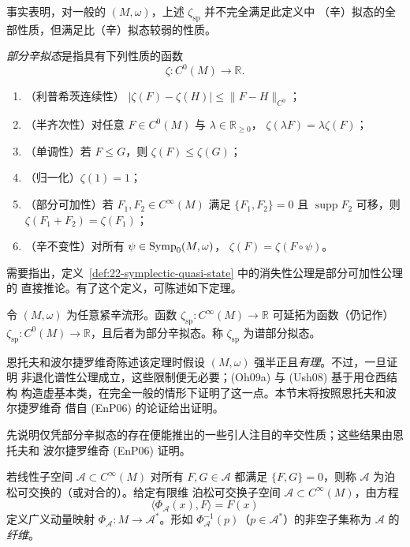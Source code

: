 事实表明，对一般的 $(M,\omega)$，上述 $\zeta_{\mathrm{sp}}$ 并不完全满足此定义中
（辛）拟态的全部性质，但满足比（辛）拟态较弱的性质。

\begin{definition}
\label{def:22-partial-symplectic-quasi-state}
\emph{部分辛拟态}是指具有下列性质的函数
\[
 \zeta:C^0(M)\longrightarrow\mathbb R.
\]
\begin{enumerate}[label=\arabic*.]
\item （利普希茨连续性）
      $|\zeta(F)-\zeta(H)|\leq\lVert F-H\rVert_{C^0}$；
\item （半齐次性）对任意 $F\in C^0(M)$ 与 $\lambda\in\mathbb R_{\geq0}$，
      $\zeta(\lambda F)=\lambda\zeta(F)$；
\item （单调性）若 $F\leq G$，则 $\zeta(F)\leq\zeta(G)$；
\item （归一化）$\zeta(1)=1$；
\item （部分可加性）若 $F_1,F_2\in C^\infty(M)$ 满足
      $\{F_1,F_2\}=0$ 且 $\operatorname{supp}F_2$ 可移，则
      $\zeta(F_1+F_2)=\zeta(F_1)$；
\item （辛不变性）对所有 $\psi\in\operatorname{Symp}_0(M,\omega)$，
      $\zeta(F)=\zeta(F\circ\psi)$。
\end{enumerate}
\end{definition}

需要指出，定义~\ref{def:22-symplectic-quasi-state} 中的消失性公理是部分可加性公理的
直接推论。有了这个定义，可陈述如下定理。

\begin{theorem}
\label{thm:22-spectral-partial-quasi-state}
令 $(M,\omega)$ 为任意紧辛流形。函数
$\zeta_{\mathrm{sp}}:C^\infty(M)\to\mathbb R$ 可延拓为函数（仍记作）
$\zeta_{\mathrm{sp}}:C^0(M)\to\mathbb R$，且后者为部分辛拟态。称
$\zeta_{\mathrm{sp}}$ 为谱部分拟态。
\end{theorem}

恩托夫和波尔捷罗维奇陈述该定理时假设 $(M,\omega)$ 强半正且\emph{有理}。不过，一旦证明
非退化谱性公理成立，这些限制便无必要；(Oh09a) 与 (Ush08) 基于用仓西结构
构造虚基本类，在完全一般的情形下证明了这一点。本节末将按照恩托夫和波尔捷罗维奇
借自 (EnP06) 的论证给出证明。

先说明仅凭部分辛拟态的存在便能推出的一些引人注目的辛交性质；这些结果由恩托夫和
波尔捷罗维奇 (EnP06) 证明。

\begin{definition}
\label{def:22-poisson-commutative}
若线性子空间 $\mathcal A\subset C^\infty(M)$ 对所有 $F,G\in\mathcal A$ 都满足
$\{F,G\}=0$，则称 $\mathcal A$ 为泊松可交换的（或对合的）。给定有限维
泊松可交换子空间 $\mathcal A\subset C^\infty(M)$，由方程
\[
 \langle\Phi_{\mathcal A}(x),F\rangle=F(x)
\]
定义广义动量映射 $\Phi_{\mathcal A}:M\to\mathcal A^*$。形如
$\Phi_{\mathcal A}^{-1}(p)$（$p\in\mathcal A^*$）的非空子集称为 $\mathcal A$ 的\emph{纤维}。
\end{definition}

